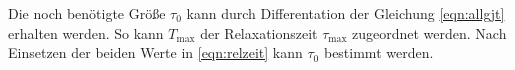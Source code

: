Die noch benötigte Größe $\tau_0$ kann durch Differentation der Gleichung \eqref{eqn:allgjt} erhalten werden. So kann $T_\text{max}$ der Relaxationszeit $\tau_\text{max}$ zugeordnet werden. Nach Einsetzen der beiden Werte in \eqref{eqn:relzeit} kann $\tau_0$ bestimmt werden.

%
%
%
%
%

